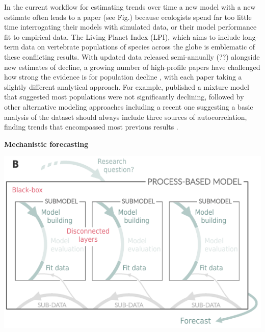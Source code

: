 \documentclass[11pt]{article}
\begin{document}
\begin{tcolorbox}
{\begin{multicols}{2}
In the current workflow for estimating trends over time a new model with a new estimate often leads to a paper (see Fig.) because ecologists spend far too little time interrogating their models with simulated data, or their model performance fit to empirical data. 
The Living Planet Index (LPI), which aims to include long-term data on vertebrate populations of species across the globe is emblematic of these conflicting results. %
With updated data released semi-annually (??) alongside new estimates of decline, a growing number of high-profile papers have challenged how strong the evidence is for population decline \citep{Dornelas2014,gonzalez2016estimating,wagner2021insect,muller2024weather}, with each paper taking a slightly different analytical approach. For example, \citet{Leung2020} published a mixture model that suggested most populations were not significantly declining, followed by other alternative modeling approaches \citep{Buschke2021,puurtinen2022living} including a recent one suggesting a basic analysis of the dataset should always include three sources of autocorrelation, finding trends that encompassed most previous results \citep{Johnson2024}. 


\vfill

\columnbreak

\centerline{\bf Mechanistic forecasting}
\vspace*{2mm}
\begin{minipage}[t]{\linewidth}
    \includegraphics[width=\linewidth]{figures/forecasting_details}


\end{minipage}
\end{multicols}}
\end{tcolorbox}
\end{document}
